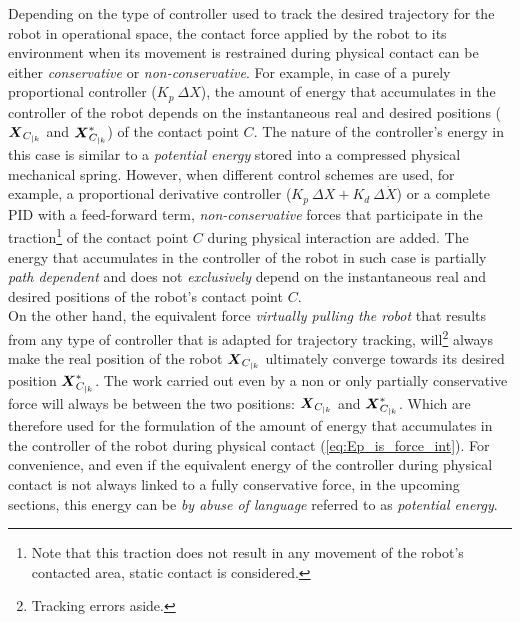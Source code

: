 Depending on the type of controller used to track the desired trajectory for the robot in operational space, the contact force applied by the robot to its environment when its movement is restrained during physical contact can be either \textit{conservative} or \textit{non-conservative}. For example, in case of a purely  proportional controller ($K_p~\Delta X$), the amount of energy that accumulates in the controller of the robot depends on the instantaneous real and desired positions ($\mbox{\boldmath${X}$}_{C_{|k}}$ and $\mbox{\boldmath${X}$}_{C_{|k}}^{*}$) of the contact point $C$. The nature  of the controller's energy in this case is similar to a \textit{potential energy} stored into a compressed physical mechanical spring. However, when different control schemes are used, for example, a proportional derivative controller ($K_p~\Delta X + K_d~\Delta \dot{X}$) or a complete PID with a feed-forward term, \textit{non-conservative} forces that participate in the traction\footnote{Note that this traction does not result in any movement of the robot's contacted area, static contact is considered.} of the contact point $C$ during physical interaction are added. The energy that accumulates in the controller of the robot in such case is partially \textit{path dependent} and does not \textit{exclusively} depend on the instantaneous real and desired positions of the robot's contact point $C$. \\
On the other hand, the equivalent force \textit{virtually pulling the robot} that results from any type of controller that is adapted for trajectory tracking, will\footnote{Tracking errors aside.} always make the real position of the robot $\mbox{\boldmath${X}$}_{C_{|k}}$ ultimately converge towards its desired position $\mbox{\boldmath${X}$}_{C_{|k}}^*$. The work carried out even by a non or only partially conservative force will always be between the two positions: $\mbox{\boldmath${X}$}_{C_{|k}}$ and $\mbox{\boldmath${X}$}_{C_{|k}}^*$. Which are therefore used for the formulation of the amount of energy that accumulates in the controller of the robot during physical contact (\ref{eq:Ep_is_force_int}). For convenience, and even if the equivalent energy of the controller during physical contact is not always linked to a fully conservative force, in the upcoming sections, this energy can be \textit{by abuse of language} referred to as \textit{potential energy}.     


